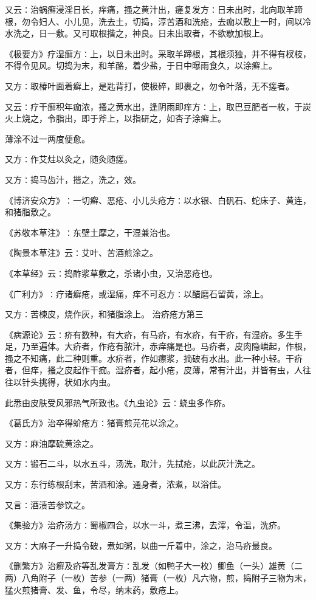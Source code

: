\documentclass[a4paper,12pt,UTF8,twoside]{ctexbook}
\begin{document}
又云∶治蜗癣浸淫日长，痒痛，搔之黄汁出，瘥复发方∶日未出时，北向取羊蹄根，勿令妇人、小儿见，洗去土，切捣，淳苦酒和洗疮，去痂以敷上一时，间以冷水洗之，日一敷。又可取根揩之，神良。日未出取者，不欲歇加根上。

《极要方》疗湿癣方∶上，以日未出时。采取羊蹄根，其根须独，并不得有杈枝，不得令见风。切捣为末，和羊酪，着少盐，于日中曝雨食久，以涂癣上。

又方∶取椿叶面着癣上，是匙背打，使极碎，即裹之，勿令叶落，无不瘥者。

又云∶疗干癣积年痂浓，搔之黄水出，逢阴雨即痒方∶上，取巴豆肥者一枚，于炭火上烧之，令脂出，即于斧上，以指研之，如杏子涂癣上。

薄涂不过一两度便愈。

又方∶作艾炷以灸之，随灸随瘥。

又方∶捣马齿汁，揩之，洗之，效。

《博济安众方》∶一切癣、恶疮、小儿头疮方∶以水银、白矾石、蛇床子、黄连，和猪脂敷之。

《苏敬本草注》∶东壁土摩之，干湿兼治也。

《陶景本草注》云∶艾叶、苦酒煎涂之。

《本草经》云∶捣酢浆草敷之，杀诸小虫，又治恶疮也。

《广利方》∶疗诸癣疮，或湿痛，痒不可忍方∶以醋磨石留黄，涂上。

又方∶苦楝皮，烧作灰，和猪脂涂上。
治疥疮方第三

《病源论》云∶疥有数种，有大疥，有马疥，有水疥，有干疥，有湿疥。多生手足，乃至遍体。大疥者，作疮有脓汁，赤痒痛是也。马疥者，皮肉隐嶙起，作根，搔之不知痛，此二种则重。水疥者，作如瘭浆，摘破有水出。此一种小轻。干疥者，但痒，搔之皮起作干痂。湿疥者，起小疮，皮薄，常有汁出，并皆有虫，人往往以针头挑得，状如水内虫。

此悉由皮肤受风邪热气所致也。《九虫论》云∶蛲虫多作疥。

《葛氏方》治卒得蚧疮方∶猪膏煎芫花以涂之。

又方∶麻油摩硫黄涂之。

又方∶锻石二斗，以水五斗，汤洗，取汁，先拭疮，以此灰汁洗之。

又方∶东行练根刮末，苦酒和涂。通身者，浓煮，以浴佳。

又言∶酒渍苦参饮之。

《集验方》治疥汤方∶蜀椒四合，以水一斗，煮三沸，去滓，令温，洗疥。

又方∶大麻子一升捣令破，煮如粥，以曲一斤着中，涂之，治马疥最良。

《删繁方》治癣及疥等乱发膏方∶乱发（如鸭子大一枚）鲫鱼（一头）雄黄（二两）八角附子（一枚）苦参（一两）猪膏（一枚）凡六物，煎，捣附子三物为末，猛火煎猪膏、发、鱼，令尽，纳末药，敷疮上。
\end{document}
